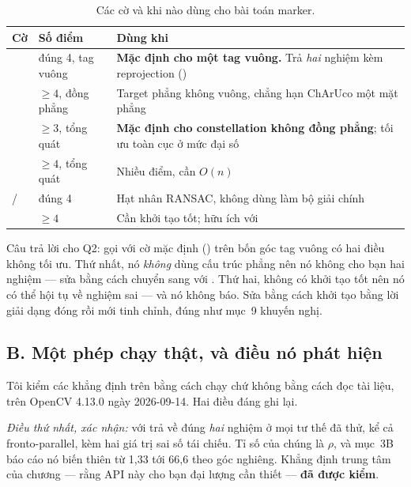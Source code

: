 \documentclass[../../marker.tex]{subfiles}
\begin{document}
\begin{table}[H]\centering\small
\caption{Các cờ  và khi nào dùng cho bài toán marker.}
\label{tab:d17-flags}
\begin{tabularx}{\linewidth}{@{}L{3.5cm}L{2.3cm}Y@{}}
\toprule
\textbf{Cờ} & \textbf{Số điểm} & \textbf{Dùng khi}\\
\midrule
{} & đúng 4, tag vuông & \textbf{Mặc định cho một tag vuông.} Trả \emph{hai} nghiệm kèm reprojection ()\\
 & \(\ge 4\), đồng phẳng & Target phẳng không vuông, chẳng hạn ChArUco một mặt phẳng\\
 & \(\ge 3\), tổng quát & \textbf{Mặc định cho constellation không đồng phẳng}; tối ưu toàn cục ở mức đại số \cite{terzakis2020sqpnp}\\
 & \(\ge 4\), tổng quát & Nhiều điểm, cần \(O(n)\) \cite{lepetit2009epnp}\\
 /  & đúng 4 & Hạt nhân RANSAC, không dùng làm bộ giải chính\\
 & \(\ge 4\) & Cần khởi tạo tốt; hữu ích với \\
\bottomrule
\end{tabularx}
\end{table}

Câu trả lời cho Q2: gọi  với cờ mặc định () trên bốn góc tag vuông có hai điều không tối ưu. Thứ nhất, nó \emph{không} dùng cấu trúc phẳng nên nó không cho bạn hai nghiệm --- sửa bằng cách chuyển sang  với . Thứ hai,  không có khởi tạo tốt nên nó có thể hội tụ về nghiệm sai --- và nó không báo. Sửa bằng cách khởi tạo bằng lời giải dạng đóng rồi mới tinh chỉnh, đúng như  mục~9 khuyến nghị.

\subsection{B. Một phép chạy thật, và điều nó phát hiện}

Tôi kiểm các khẳng định trên bằng cách chạy chứ không bằng cách đọc tài liệu, trên OpenCV 4.13.0 ngày 2026-09-14. Hai điều đáng ghi lại.

\emph{Điều thứ nhất, xác nhận:}  với  trả về đúng \emph{hai} nghiệm ở mọi tư thế đã thử, kể cả fronto-parallel, kèm hai giá trị sai số tái chiếu. Tỉ số của chúng là \(\rho\), và  mục~3B báo cáo nó biến thiên từ 1,33 tới 66,6 theo góc nghiêng. Khẳng định trung tâm của chương --- rằng API này cho bạn đại lượng cần thiết --- \textbf{đã được kiểm}.
\end{document}
